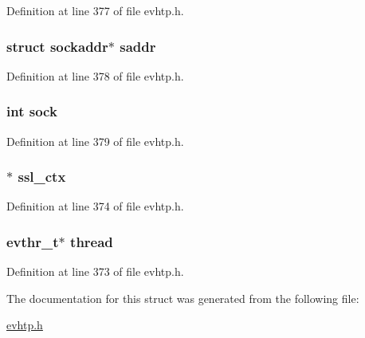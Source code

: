 Definition at line 377 of file evhtp.h.

\hypertarget{structevhtp__connection__s_a95957a2d67e88843dae4b71c658b6ecb}{
\subsubsection[{saddr}]{\setlength{\rightskip}{0pt plus 5cm}struct sockaddr$\ast$ {\bf saddr}}}
\label{structevhtp__connection__s_a95957a2d67e88843dae4b71c658b6ecb}


Definition at line 378 of file evhtp.h.

\hypertarget{structevhtp__connection__s_a5903d0b282fc5eae503de618f896b5e1}{
\subsubsection[{sock}]{\setlength{\rightskip}{0pt plus 5cm}int {\bf sock}}}
\label{structevhtp__connection__s_a5903d0b282fc5eae503de618f896b5e1}


Definition at line 379 of file evhtp.h.

\hypertarget{structevhtp__connection__s_afddd0c7c8575888dd2faa52cc3596b1c}{
\subsubsection[{ssl\_\-ctx}]{$\ast$ {\bf ssl\_\-ctx}}}
\label{structevhtp__connection__s_afddd0c7c8575888dd2faa52cc3596b1c}


Definition at line 374 of file evhtp.h.

\hypertarget{structevhtp__connection__s_aaf924ac18ad3dd26c8676d835116579e}{
\subsubsection[{thread}]{\setlength{\rightskip}{0pt plus 5cm}evthr\_\-t$\ast$ {\bf thread}}}
\label{structevhtp__connection__s_aaf924ac18ad3dd26c8676d835116579e}


Definition at line 373 of file evhtp.h.



The documentation for this struct was generated from the following file:\begin{DoxyCompactItemize}
\item 
\hyperlink{evhtp_8h}{evhtp.h}\end{DoxyCompactItemize}
